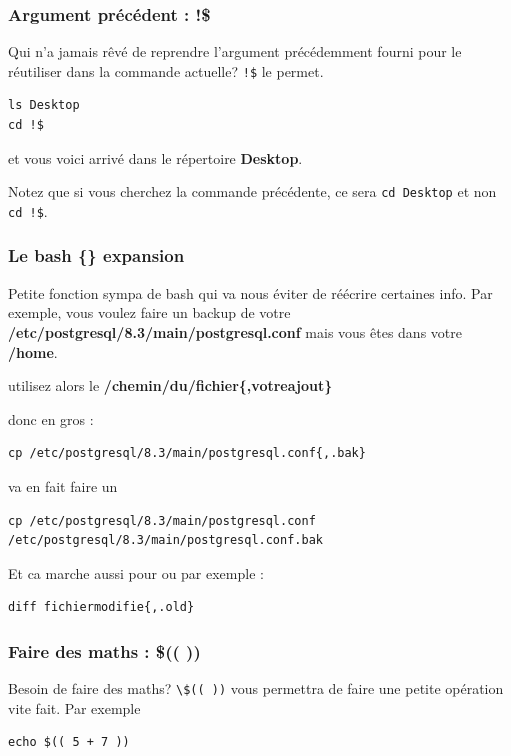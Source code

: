 \documentclass[a4paper,twoside]{article}
\begin{document}
\subsubsection{Argument précédent : !\$}

Qui n'a jamais rêvé de reprendre l'argument précédemment fourni pour le réutiliser dans la commande actuelle? \verb|!$| le permet.

\begin{verbatim}
ls Desktop
cd !$
\end{verbatim}

et vous voici arrivé dans le répertoire \textbf{Desktop}.

\begin{remarque}
Notez que si vous cherchez la commande précédente, ce sera \texttt{cd Desktop} et non \verb|cd !$|.
\end{remarque}


\subsubsection{Le bash \{\} expansion}

Petite fonction sympa de bash qui va nous éviter de réécrire certaines info. Par exemple, vous voulez faire un backup de votre \textbf{/etc/postgresql/8.3/main/postgresql.conf} mais vous êtes dans votre \textbf{/home}.

utilisez alors le \textbf{/chemin/du/fichier\{,votreajout\}}

donc en gros :

\begin{verbatim}
cp /etc/postgresql/8.3/main/postgresql.conf{,.bak}
\end{verbatim}

va en fait faire un
\begin{small}\begin{verbatim}
cp /etc/postgresql/8.3/main/postgresql.conf /etc/postgresql/8.3/main/postgresql.conf.bak
\end{verbatim}\end{small}



Et ca marche aussi pour  ou  par exemple :

\begin{verbatim}
diff fichiermodifie{,.old}
\end{verbatim}

\subsubsection{Faire des maths : \$(( ))}
Besoin de faire des maths? \verb|\$(( ))| vous permettra de faire une petite opération vite fait. Par exemple
\begin{verbatim}
echo $(( 5 + 7 ))
\end{verbatim}
\end{document}
